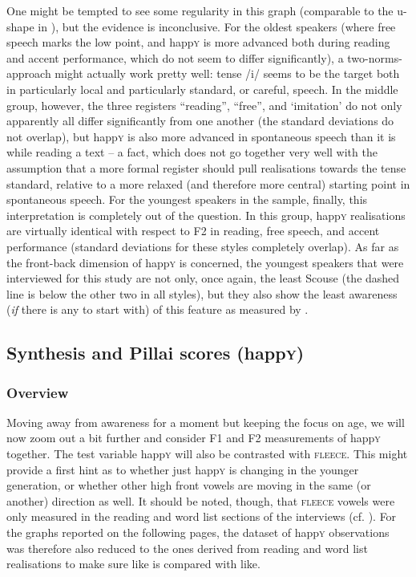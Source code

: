 One might be tempted to see some regularity in this graph (comparable to the u-shape in ), but the evidence is inconclusive.
For the oldest speakers (where free speech marks the low point, and happ\textsc{y} is more advanced both during reading and accent performance, which do not seem to differ significantly), a two-norms-approach might actually work pretty well: tense /i/ seems to be the target both in particularly local and particularly standard, or careful, speech.
In the middle group, however, the three registers ``reading'', ``free'', and `imitation' do not only apparently all differ significantly from one another (the standard deviations do not overlap), but happ\textsc{y} is also more advanced in spontaneous speech than it is while reading a text -- a fact, which does not go together very well with the assumption that a more formal register should pull realisations towards the tense standard, relative to a more relaxed (and therefore more central) starting point in spontaneous speech.
For the youngest speakers in the sample, finally, this interpretation is completely out of the question.
In this group, happ\textsc{y} realisations are virtually identical with respect to F2 in reading, free speech, and accent performance (standard deviations for these styles completely overlap).
As far as the front-back dimension of happ\textsc{y} is concerned, the youngest speakers that were interviewed for this study are not only, once again, the least Scouse (the dashed line is below the other two in all styles), but they also show the least awareness (\emph{if} there is any to start with) of this feature as measured by .

\subsection{Synthesis and Pillai scores (happ\textsc{y})}
\label{sec.prod.res.vow.happy.pil}

\subsubsection{Overview}

Moving away from awareness for a moment but keeping the focus on age, we will now zoom out a bit further and consider F1 and F2 measurements of happ\textsc{y} together.
The test variable happ\textsc{y} will also be contrasted with \textsc{fleece}.
This might provide a first hint as to whether just happ\textsc{y} is changing in the younger generation, or whether other high front vowels are moving in the same (or another) direction as well.
It should be noted, though, that \textsc{fleece} vowels were only measured in the reading and word list sections of the interviews (cf. ).
For the graphs reported on the following pages, the dataset of happ\textsc{y} observations was therefore also reduced to the ones derived from reading and word list realisations to make sure like is compared with like.


